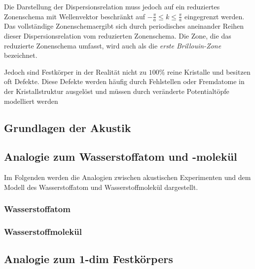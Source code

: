 Die Darstellung der Dispersionsrelation muss jedoch auf ein reduziertes Zonenschema mit Wellenvektor beschränkt auf $- \frac{\pi}{a} \leq k \leq \frac{\pi}{a}$ eingegrenzt werden. Das vollständige Zonenschemaergibt sich durch periodisches aneinander Reihen dieser Dispersionsrelation vom reduzierten Zonenschema. Die Zone, die das reduzierte Zonenschema umfasst, wird auch als die \textit{erste Brillouin-Zone} bezeichnet.  

Jedoch sind Festkörper in der Realität nicht zu $100 \%$ reine Kristalle und besitzen oft Defekte. Diese Defekte werden häufig durch Fehlstellen oder Fremdatome in der Kristallstruktur ausgelöst und müssen durch veränderte Potentialtöpfe modelliert werden

\subsection{Grundlagen der Akustik}
\label{sec:akustik}



\subsection{Analogie zum Wasserstoffatom und -molekül}
\label{sec:analogien}

Im Folgenden werden die Analogien zwischen akustischen Experimenten und dem Modell des Wasserstoffatom und Wasserstoffmolekül dargestellt.

\subsubsection{Wasserstoffatom}
\label{sec:ana-H}



\subsubsection{Wasserstoffmolekül}
\label{sec:ana-H2}



\subsection{Analogie zum 1-dim Festkörpers}
\label{ana-fest}


